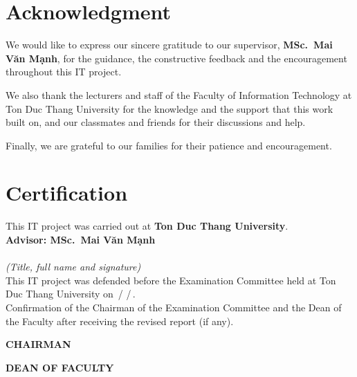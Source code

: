 \documentclass[a4paper]{report}
\newcommand{\vietnamesetext}[1]{{\fontencoding{T5}\fontfamily{ptm}\selectfont #1}}
\begin{document}
\clearpage
{}
\hypersetup{pageanchor=true}

\chapter*{Acknowledgment}

We would like to express our sincere gratitude to our supervisor,
\textbf{MSc.~Mai \vietnamesetext{Văn Mạnh}}, for the guidance, the constructive feedback and the
encouragement throughout this IT project.

We also thank the lecturers and staff of the Faculty of Information Technology
at Ton Duc Thang University for the knowledge and the support that this work
built on, and our classmates and friends for their discussions and help.

Finally, we are grateful to our families for their patience and encouragement.

\chapter*{Certification}

This IT project was carried out at \textbf{Ton Duc Thang University}.\\[0.5em]
\textbf{Advisor: MSc.~Mai \vietnamesetext{Văn Mạnh}}\\[3em]
\makebox[0.6\textwidth]{\dotfill}\\
\textit{(Title, full name and signature)}\\[3em]

This IT project was defended before the Examination Committee held at Ton Duc
Thang University on \makebox[2.5em]{\dotfill}\,/\,\makebox[2.5em]{\dotfill}\,/\,\makebox[4em]{\dotfill}.\\[3em]

Confirmation of the Chairman of the Examination Committee and the Dean of the
Faculty after receiving the revised report (if any).\\[3em]

\noindent
\begin{minipage}[t]{0.48\textwidth}
  \centering
  \textbf{CHAIRMAN}\\[6em]
  \dotfill
\end{minipage}\hfill
\begin{minipage}[t]{0.48\textwidth}
  \centering
  \textbf{DEAN OF FACULTY}\\[6em]
  \dotfill
\end{minipage}
\end{document}

